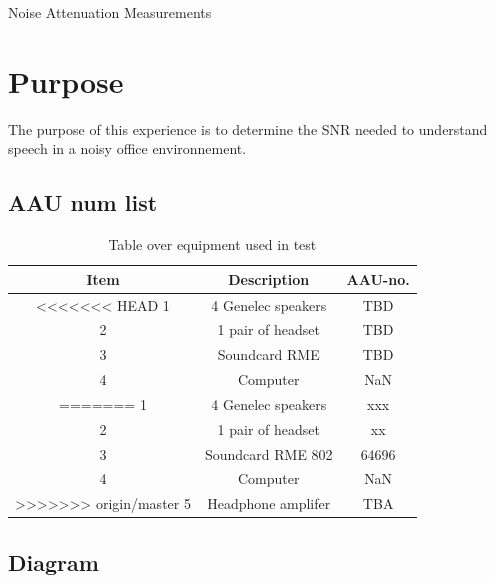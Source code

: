 \documentclass[12pt,a4paper]{article}
\begin{document}
\begin{Huge}
\begin{center}
Noise Attenuation Measurements
\end{center}
\end{Huge}


\section{Purpose}

The purpose of this experience is to determine the SNR needed to understand speech in a noisy office environnement.

\subsection{AAU num list}

\begin{table}[h]
	\centering
	
	\begin{tabular}{ c c c } \toprule
		{Item} & {Description} & {AAU-no}. \\ \bottomrule 
<<<<<<< HEAD
		1      &  4 Genelec speakers						& TBD	\\
		2      &  1 pair of headset						& TBD		\\
		3      &  Soundcard RME                      	& TBD		\\
		4      &  Computer								   & NaN		\\  
=======
		1      &  4 Genelec speakers					& xxx	\\
		2      &  1 pair of headset						& xx		\\
		3      &  Soundcard RME 802                    	& 64696		\\
		4      &  Computer								& NaN		\\  
>>>>>>> origin/master
		5      &  Headphone amplifer    				& TBA		\\ \bottomrule 
	\end{tabular}
	\caption{Table over equipment used in test}
	\label{tab:UsedEquipmentListning1}
\end{table}



\subsection{Diagram}
\end{document}
